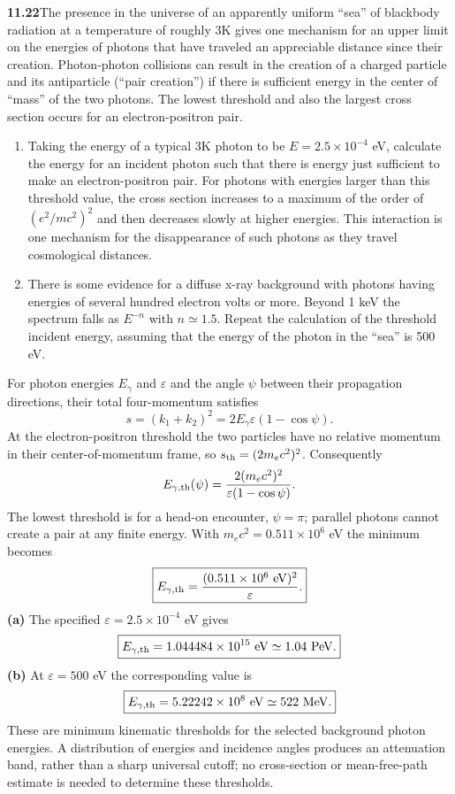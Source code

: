 \par\bigskip
\noindent\textbf{11.22}\quad The presence in the universe of an apparently uniform ``sea'' of blackbody radiation at a temperature of roughly 3K gives one mechanism for an upper limit on the energies of photons that have traveled an appreciable distance since their creation. Photon-photon collisions can result in the creation of a charged particle and its antiparticle (``pair creation'') if there is sufficient energy in the center of ``mass'' of the two photons. The lowest threshold and also the largest cross section occurs for an electron-positron pair.
\begin{enumerate}
\item[(a)] Taking the energy of a typical 3K photon to be $E=2.5\times10^{-4}$ eV, calculate the energy for an incident photon such that there is energy just sufficient to make an electron-positron pair. For photons with energies larger than this threshold value, the cross section increases to a maximum of the order of $(e^{2}/mc^{2})^{2}$ and then decreases slowly at higher energies. This interaction is one mechanism for the disappearance of such photons as they travel cosmological distances.
\item[(b)] There is some evidence for a diffuse x-ray background with photons having energies of several hundred electron volts or more. Beyond 1 keV the spectrum falls as $E^{-n}$ with $n\simeq1.5$. Repeat the calculation of the threshold incident energy, assuming that the energy of the photon in the ``sea'' is 500 eV.
\end{enumerate}
\solution
For photon energies $E_\gamma$ and $\varepsilon$ and the
angle $\psi$ between their propagation directions, their total
four-momentum satisfies
\[
s=(k_1+k_2)^2=2E_\gamma\varepsilon(1-\cos\psi).
\]
At the electron-positron threshold the two particles have no
relative momentum in their center-of-momentum frame, so
$s_{\rm th}=(2m_ec^2)^2$. Consequently
\[
E_{\gamma,\rm th}(\psi)=\frac{2(m_ec^2)^2}
{\varepsilon(1-\cos\psi)}.
\]
The lowest threshold is for a head-on encounter, $\psi=\pi$;
parallel photons cannot create a pair at any finite energy. With
$m_ec^2=0.511\times10^6$ eV the minimum becomes
\[
\boxed{E_{\gamma,\rm th}=\frac{(0.511\times10^6\ \mathrm{eV})^2}
{\varepsilon}.}
\]
\textbf{(a)} The specified $\varepsilon=2.5\times10^{-4}$ eV gives
\[
\boxed{E_{\gamma,\rm th}=1.044484\times10^{15}\ \mathrm{eV}
\simeq1.04\ \mathrm{PeV}.}
\]
\textbf{(b)} At $\varepsilon=500$ eV the corresponding value is
\[
\boxed{E_{\gamma,\rm th}=5.22242\times10^8\ \mathrm{eV}
\simeq522\ \mathrm{MeV}.}
\]
These are minimum kinematic thresholds for the selected background
photon energies. A distribution of energies and incidence angles
produces an attenuation band, rather than a sharp universal cutoff;
no cross-section or mean-free-path estimate is needed to determine
these thresholds.

